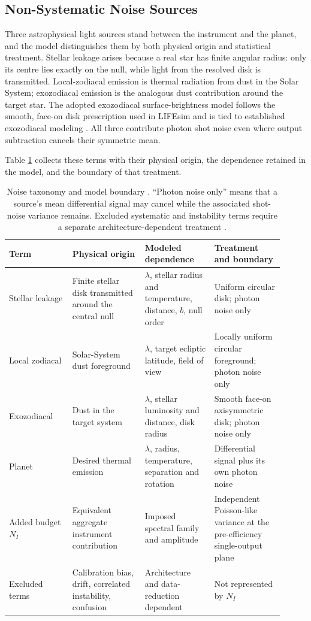 \documentclass[12pt,a4paper]{article}
\numberwithin{equation}{section}
\numberwithin{figure}{section}
\numberwithin{table}{section}
\begin{document}
\subsection{Non-Systematic Noise Sources} \label{sec: intro: noise sources}
Three astrophysical light sources stand between the instrument and the planet, and the model distinguishes them by both physical origin and statistical treatment. Stellar leakage arises because a real star has finite angular radius: only its centre lies exactly on the null, while light from the resolved disk is transmitted. Local-zodiacal emission is thermal radiation from dust in the Solar System; exozodiacal emission is the analogous dust contribution around the target star. The adopted exozodiacal surface-brightness model follows the smooth, face-on disk prescription used in LIFEsim and is tied to established exozodiacal modeling \cite{kennedy2015,dannert2022life2}. All three contribute photon shot noise even where output subtraction cancels their symmetric mean.

Table \ref{tab: noise taxonomy} collects these terms with their physical origin, the dependence retained in the model, and the boundary of that treatment.

\begin{table}[htbp]
\centering
\begin{tabular}{@{}p{0.21\linewidth}p{0.24\linewidth}p{0.23\linewidth}p{0.23\linewidth}@{}}
\toprule
Term & Physical origin & Modeled dependence & Treatment and boundary \\
\midrule
Stellar leakage & Finite stellar disk transmitted around the central null & $\lambda$, stellar radius and temperature, distance, $b$, null order & Uniform circular disk; photon noise only \\
Local zodiacal & Solar-System dust foreground & $\lambda$, target ecliptic latitude, field of view & Locally uniform circular foreground; photon noise only \\
Exozodiacal & Dust in the target system & $\lambda$, stellar luminosity and distance, disk radius & Smooth face-on axisymmetric disk; photon noise only \\
Planet & Desired thermal emission & $\lambda$, radius, temperature, separation and rotation & Differential signal plus its own photon noise \\
Added budget $N_I$ & Equivalent aggregate instrument contribution & Imposed spectral family and amplitude & Independent Poisson-like variance at the pre-efficiency single-output plane \\
Excluded terms & Calibration bias, drift, correlated instability, confusion & Architecture and data-reduction dependent & Not represented by $N_I$ \\
\bottomrule
\end{tabular}
\caption{Noise taxonomy and model boundary \cite{dannert2022life2,kennedy2015}. ``Photon noise only'' means that a source's mean differential signal may cancel while the associated shot-noise variance remains. Excluded systematic and instability terms require a separate architecture-dependent treatment \cite{lay2004systematic,dannert2025thesis}.}
\label{tab: noise taxonomy}
\end{table}
\end{document}
